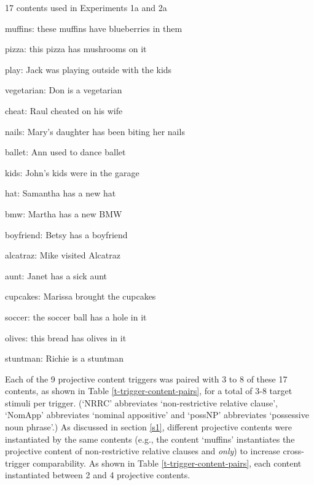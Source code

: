 \documentclass[11pt,fleqn]{article}
\newcommand{\6}{\mbox{$[\hspace*{-.6mm}[$}}
\newcommand{\9}{\mbox{$]\hspace*{-.6mm}]$}}
\begin{document}
\begin{exe}
\ex\label{contents} 17 contents used in Experiments 1a and 2a

\begin{enumerate}[topsep=0pt,itemsep=-.5mm]

\ex muffins: these muffins have blueberries in them

\ex pizza: this pizza has mushrooms on it

\ex play: Jack was playing outside with the kids

\ex vegetarian: Don is a vegetarian

\ex cheat: Raul cheated on his wife

\ex nails: Mary's daughter has been biting her nails

\ex ballet: Ann used to dance ballet

\ex kids: John's kids were in the garage

\ex hat: Samantha has a new hat

\ex bmw: Martha has a new BMW

\ex boyfriend: Betsy has a boyfriend

\ex alcatraz: Mike visited Alcatraz

\ex aunt: Janet has a sick aunt

\ex cupcakes: Marissa brought the cupcakes

\ex soccer: the soccer ball has a hole in it

\ex olives: this bread has olives in it

\ex stuntman: Richie is a stuntman

\end{enumerate}
\end{exe}

Each of the 9 projective content triggers was paired with 3 to 8 of these 17 contents, as shown in Table \ref{t-trigger-content-pairs}, for a total of 3-8 target stimuli per trigger. (`NRRC' abbreviates `non-restrictive relative clause', `NomApp' abbreviates `nominal appositive' and `possNP' abbreviates `possessive noun phrase'.) As discussed in section \ref{s1}, different projective contents were instantiated by the same contents (e.g., the content `muffins' instantiates the projective content of non-restrictive relative clauses and {\em only}) to increase cross-trigger comparability. As shown in Table \ref{t-trigger-content-pairs}, each content instantiated between 2 and 4 projective contents.
\end{document}
